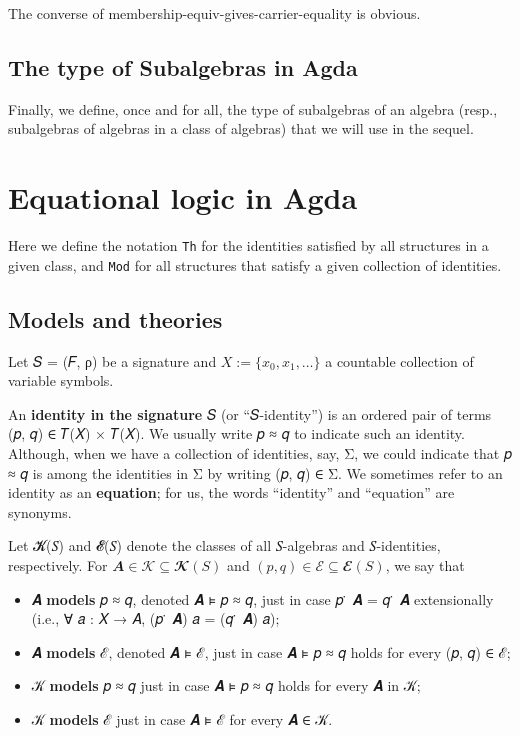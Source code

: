 \documentclass[a4paper,USenglish,cleveref,autoref,thm-restate]{lipics-v2019}
\begin{document}
The converse of membership-equiv-gives-carrier-equality is obvious.
\begin{code}\end{code}

\subsection{The type of Subalgebras in Agda}\label{the-type-of-subalgebras-in-agda}
Finally, we define, once and for all, the type of subalgebras of an algebra (resp., subalgebras of algebras in a class of algebras) that we will use in the sequel.
\begin{code}\end{code}



\section{Equational logic in Agda}\label{equational-logic-in-agda}
Here we define the notation \texttt{Th} for the identities satisfied by all structures in a given class, and \texttt{Mod} for all structures that satisfy a given collection of identities.





\subsection{Models and theories}\label{models-and-theories}
Let 𝑆 = (𝐹, ρ) be a signature and \(X := \{x_0, x_1, \dots\}\) a countable collection of variable symbols.

An \textbf{identity in the signature} 𝑆 (or ``𝑆-identity'') is an ordered pair of terms (𝑝, 𝑞) ∈ 𝑇(𝑋) × 𝑇(𝑋). We usually write 𝑝 ≈ 𝑞 to indicate such an identity. Although, when we have a collection of identities, say, Σ, we could indicate that 𝑝 ≈ 𝑞 is among the identities in Σ by writing (𝑝, 𝑞) ∈ Σ. We sometimes refer to an identity as an \textbf{equation}; for us, the words ``identity'' and ``equation'' are synonyms.

Let 𝓚(𝑆) and 𝓔(𝑆) denote the classes of all 𝑆-algebras and 𝑆-identities, respectively. For \(𝑨 ∈ 𝒦 ⊆ 𝓚(𝑆)\) and \((𝑝, 𝑞) ∈ ℰ ⊆ 𝓔(𝑆)\), we say that
\begin{itemize}
\item 𝑨 \textbf{models} 𝑝 ≈ 𝑞, denoted 𝑨 ⊧ 𝑝 ≈ 𝑞, just in case 𝑝 ̇ 𝑨 = 𝑞 ̇ 𝑨 extensionally (i.e., ∀ 𝑎 : 𝑋 → 𝐴, (𝑝 ̇ 𝑨) 𝑎 = (𝑞 ̇ 𝑨) 𝑎);
\item 𝑨 \textbf{models} ℰ, denoted 𝑨 ⊧ ℰ, just in case 𝑨 ⊧ 𝑝 ≈ 𝑞 holds for every (𝑝, 𝑞) ∈ ℰ;
\item 𝒦 \textbf{models} 𝑝 ≈ 𝑞 just in case 𝑨 ⊧ 𝑝 ≈ 𝑞 holds for every 𝑨 in 𝒦;
\item 𝒦 \textbf{models} ℰ just in case 𝑨 ⊧ ℰ for every 𝑨 ∈ 𝒦.
\end{itemize}
\end{document}
